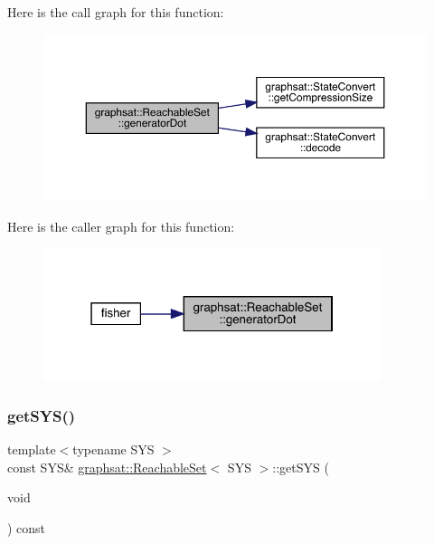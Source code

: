 Here is the call graph for this function\+:
\nopagebreak
\begin{figure}[H]
\begin{center}
\leavevmode
\includegraphics[width=350pt]{classgraphsat_1_1_reachable_set_a74be21480221cb48e2ce100ce712085b_cgraph}
\end{center}
\end{figure}
Here is the caller graph for this function\+:
\nopagebreak
\begin{figure}[H]
\begin{center}
\leavevmode
\includegraphics[width=280pt]{classgraphsat_1_1_reachable_set_a74be21480221cb48e2ce100ce712085b_icgraph}
\end{center}
\end{figure}
\mbox{\label{classgraphsat_1_1_reachable_set_a6254c1874c388dcab4be00b694458d4b}} 
\subsubsection{\texorpdfstring{getSYS()}{getSYS()}}
{\footnotesize\ttfamily template$<$typename S\+YS $>$ \\
const S\+YS\& \mbox{\hyperlink{classgraphsat_1_1_reachable_set}{graphsat\+::\+Reachable\+Set}}$<$ S\+YS $>$\+::get\+S\+YS (\begin{DoxyParamCaption}\item[{void}]{ }\end{DoxyParamCaption}) const\hspace{0.3cm}{\ttfamily [inline]}}

